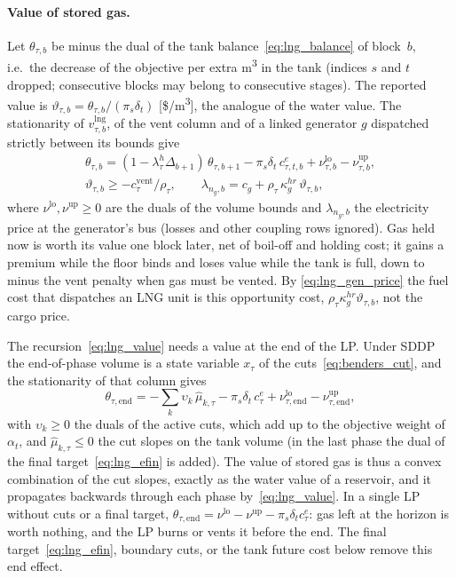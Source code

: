 \paragraph{Value of stored gas.}
Let $\theta_{\tau,b}$ be minus the dual of the tank
balance~\eqref{eq:lng_balance} of block~$b$, i.e.\ the decrease of the
objective per extra m\textsuperscript{3} in the tank (indices $s$ and
$t$ dropped; consecutive blocks may belong to consecutive stages).  The
reported value is $\vartheta_{\tau,b} = \theta_{\tau,b}/(\pi_s\delta_t)$
[\$/m\textsuperscript{3}], the analogue of the water value.  The
stationarity of $v^{\mathrm{lng}}_{\tau,b}$, of the vent column and of
a linked generator $g$ dispatched strictly between its bounds give
\begin{gather}
\theta_{\tau,b} = (1-\lambda^h_\tau\Delta_{b+1})\,\theta_{\tau,b+1}
  - \pi_s\delta_t\, c^{e}_{\tau,t,b} + \nu^{\mathrm{lo}}_{\tau,b}
  - \nu^{\mathrm{up}}_{\tau,b},
  \label{eq:lng_value} \\
\vartheta_{\tau,b} \geq -c^{\mathrm{vent}}_\tau/\rho_\tau ,
  \qquad
\lambda_{n_g,b} = c_g + \rho_\tau\,\kappa^{hr}_g\,\vartheta_{\tau,b},
  \label{eq:lng_gen_price}
\end{gather}
where $\nu^{\mathrm{lo}}, \nu^{\mathrm{up}} \geq 0$ are the duals of the
volume bounds and $\lambda_{n_g,b}$ the electricity price at the
generator's bus (losses and other coupling rows ignored).  Gas held now
is worth its value one block later, net of boil-off and holding cost;
it gains a premium while the floor binds and loses value while the tank
is full, down to minus the vent penalty when gas must be vented.  By
\eqref{eq:lng_gen_price} the fuel cost that dispatches an LNG unit is
this opportunity cost, $\rho_\tau\kappa^{hr}_g\vartheta_{\tau,b}$, not
the cargo price.

The recursion~\eqref{eq:lng_value} needs a value at the end of the LP.
Under SDDP the end-of-phase volume is a state variable $x_\tau$ of the
cuts~\eqref{eq:benders_cut}, and the stationarity of that column gives
\begin{equation}
\label{eq:lng_cut_value}
\theta_{\tau,\mathrm{end}} = -\sum_{k} \upsilon_k\, \hat\mu_{k,\tau}
  - \pi_s\delta_t\, c^{e}_{\tau}
  + \nu^{\mathrm{lo}}_{\tau,\mathrm{end}} - \nu^{\mathrm{up}}_{\tau,\mathrm{end}},
\end{equation}
with $\upsilon_k \geq 0$ the duals of the active cuts, which add up to
the objective weight of $\alpha_t$, and $\hat\mu_{k,\tau} \leq 0$ the
cut slopes on the tank volume (in the last phase the dual of the final
target~\eqref{eq:lng_efin} is added).  The value of stored gas is thus a
convex combination of the cut slopes, exactly as the water value of a
reservoir, and it propagates backwards through each phase
by~\eqref{eq:lng_value}.  In a single LP without cuts or a final
target, $\theta_{\tau,\mathrm{end}} = \nu^{\mathrm{lo}} - \nu^{\mathrm{up}}
- \pi_s\delta_t c^{e}_\tau$:
gas left at the horizon is worth nothing, and the LP burns or vents it
before the end.  The final target~\eqref{eq:lng_efin}, boundary cuts,
or the tank future cost below remove this end effect.

